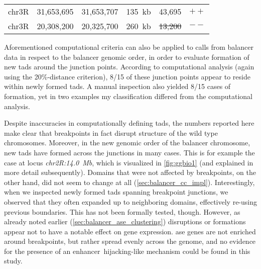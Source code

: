 \begin{table}[ht]
\begin{tabu}{lrrrrl}
        chr3R  & 31,653,695  & 31,653,707  &  135~kb &       43,695  &  $++$  \\
        chr3R  & 20,308,200  & 20,325,700  &  260~kb & \sout{13,200} &  $--$  \\
        \bottomrule
    \end{tabu}
\end{table}

Aforementioned computational criteria can also be applied to \tad calls from
balancer \hic data in respect to the balancer genomic order, in order to
evaluate formation of new \acp{tad} around the junction points. According to
computational analysis (again using the 20\%-distance criterion), 8/15 of these
junction points appear to reside within newly formed \acp{tad}. A manual
inspection also yielded 8/15 cases of \tad formation, yet in two examples my
classification differed from the computational analysis.

Despite inaccuracies in computationally defining \acp{tad}, the numbers reported
here make clear that breakpoints in fact disrupt \tad structure of the wild type
chromosomes. Moreover, in the new genomic order of the balancer chromosome, new
\acp{tad} have formed across the junctions in many cases. This is for example the
case at locus \textit{chr2R:14.0~Mb}, which is visualized in \cref{fig:ggbio1}
(and explained in more detail subsequently). Domains that were not affected by
breakpoints, on the other hand, did not seem to change at all
(\cref{sec:balancer_cc_impl}).
Interestingly, when we inspected newly formed \acp{tad} spanning breakpoint
junctions, we observed that they often expanded up to neighboring domains,
effectively re-using previous \tad boundaries. This has not been formally tested,
though. However, as already noted earlier (\cref{sec:balancer_ase_clustering})
\tad disruptions or formations appear not to have a notable effect on gene
expression. \Ac{ase} genes are not enriched around breakpoints, but rather
spread evenly across the genome, and no evidence for the presence of an
enhancer\ hijacking-like mechanism could be found in this study.






